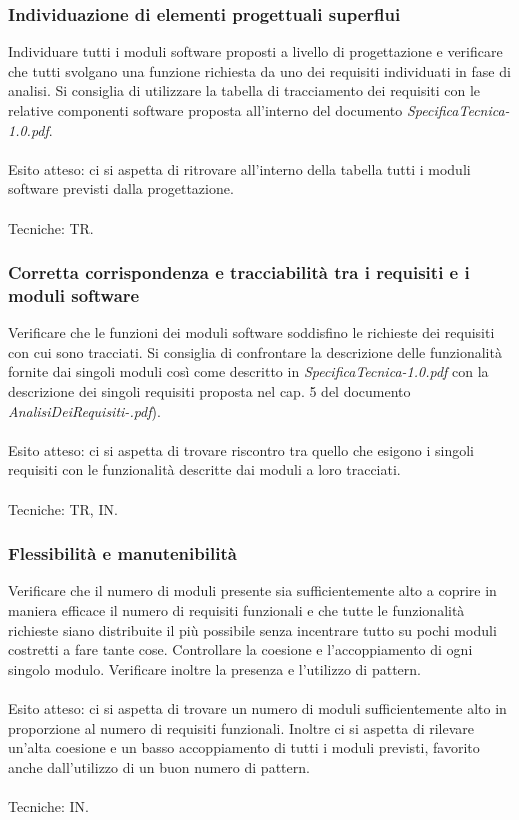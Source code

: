 \subsubsection*{Individuazione di elementi progettuali superflui}

Individuare tutti i moduli software proposti a livello di progettazione e
verificare che tutti svolgano una funzione richiesta da uno dei requisiti individuati in fase
di analisi. Si consiglia di utilizzare la tabella di tracciamento dei requisiti
con le relative componenti software proposta all'interno del documento
\emph{SpecificaTecnica-1.0.pdf}.
\\\\
Esito atteso: ci si aspetta di ritrovare all'interno della tabella tutti i
moduli software previsti dalla progettazione.
\\\\
Tecniche: TR.

\subsubsection*{Corretta corrispondenza e tracciabilit\`a tra i requisiti e i
moduli software}

Verificare che le funzioni dei moduli software soddisfino le richieste dei
requisiti con cui sono tracciati. Si consiglia di confrontare la descrizione
delle funzionalit\`a fornite dai singoli moduli cos\`i come descritto in
\emph{SpecificaTecnica-1.0.pdf} con la descrizione dei singoli requisiti
proposta nel cap. 5 del documento \emph{AnalisiDeiRequisiti-\versioneAR.pdf}).
\\\\
Esito atteso: ci si aspetta di trovare riscontro tra quello che esigono i
singoli requisiti con le funzionalit\`a descritte dai moduli a loro tracciati.
\\\\
Tecniche: TR, IN.


\subsubsection*{Flessibilit\`a e manutenibilit\`a}

Verificare che il numero di moduli presente sia sufficientemente alto a coprire
in maniera efficace il numero di requisiti funzionali e che tutte le
funzionalit\`a richieste siano distribuite il pi\`u possibile senza incentrare
tutto su pochi moduli costretti a fare tante cose. Controllare la coesione e
l'accoppiamento di ogni singolo modulo. Verificare inoltre la presenza e
l'utilizzo di pattern.
\\\\
Esito atteso: ci si aspetta di trovare un numero di moduli sufficientemente alto
in proporzione al numero di requisiti funzionali. Inoltre ci si aspetta di
rilevare un'alta coesione e un basso accoppiamento di tutti i moduli previsti,
favorito anche dall'utilizzo di un buon numero di pattern. 
\\\\
Tecniche: IN.


